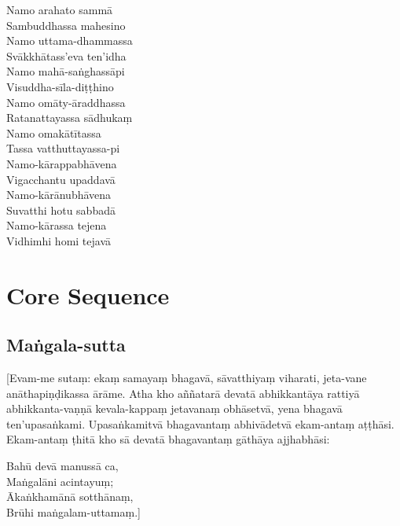 \begin{paritta}
  Namo arahato sammā\\
  Sambuddhassa mahesino\\
  Namo uttama-dhammassa\\
  Svākkhātass'eva ten'idha\\
  Namo mahā-saṅghassāpi\\
  Visuddha-sīla-diṭṭhino\\
  Namo omāty-āraddhassa\\
  Ratanattayassa sādhukaṃ\\
  Namo omakātītassa\\
  Tassa vatthuttayassa-pi\\
  Namo-kārappabhāvena\\
  Vigacchantu upaddavā\\
  Namo-kārānubhāvena\\
  Suvatthi hotu sabbadā\\
  Namo-kārassa tejena\\
  Vidhimhi homi tejavā 
\end{paritta}

\section{Core Sequence}

\subsection{Maṅgala-sutta}
\label{asevana}

[Evam-me sutaṃ: ekaṃ samayaṃ bhagavā, sāvatthiyaṃ viharati, jeta-vane
anāthapiṇḍikassa ārāme. Atha kho aññatarā devatā abhikkantāya rattiyā
abhikkanta-vaṇṇā kevala-kappaṃ jetavanaṃ obhāsetvā, yena bhagavā ten'upasaṅkami.
Upasaṅkamitvā bhagavantaṃ abhivādetvā ekam-antaṃ aṭṭhāsi. Ekam-antaṃ ṭhitā kho
sā devatā bhagavantaṃ gāthāya ajjhabhāsi:

Bahū devā manussā ca,\\
Maṅgalāni acintayuṃ;\\
Ākaṅkhamānā sotthānaṃ,\\
Brūhi maṅgalam-uttamaṃ.]

\bigskip


